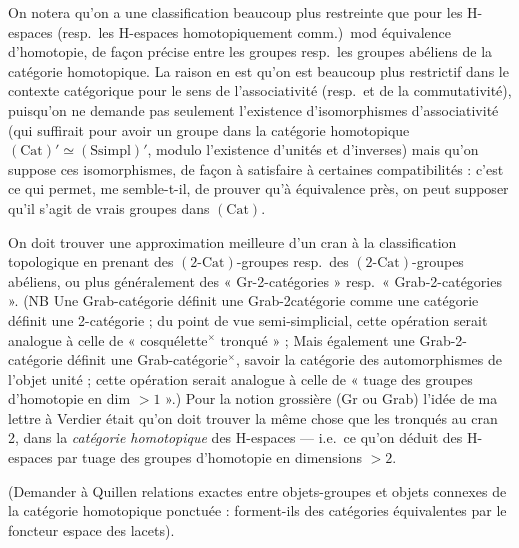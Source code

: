 \documentclass[11pt,a4paper]{article}
\begin{document}
On notera qu'on a une classification beaucoup plus restreinte que pour les
H-espaces (resp.\ les H-espaces homotopiquement comm.)\ mod équivalence
d'homotopie, de façon précise entre les groupes resp.\ les groupes abéliens de
la catégorie homotopique. La raison en est qu'on est beaucoup plus restrictif
dans le contexte catégorique pour le sens de l'associativité (resp.\ et de la
commutativité), puisqu'on ne demande pas seulement l'existence d'isomorphismes
d'associativité (qui suffirait pour avoir un groupe dans la catégorie
homotopique $(\mathrm{Cat})' \simeq (\mathrm{Ssimpl})'$, modulo l'existence
d'unités et d'inverses) mais qu'on suppose  ces
isomorphismes, de façon à satisfaire à certaines compatibilités : c'est ce qui
permet, me semble-t-il, de prouver qu'à équivalence près, on peut supposer
qu'il s'agit de vrais groupes dans $(\mathrm{Cat})$.


On doit trouver une approximation meilleure d'un cran à la classification
topologique en prenant des $(2\text{-Cat})$-groupes resp.\ des
$(2\text{-Cat})$-groupes abéliens, ou plus généralement des
« Gr-2-catégories » resp.\ « Grab-2-catégories ». (NB Une Grab-catégorie
définit une Grab-2catégorie comme une catégorie définit une 2-catégorie ; du
point de vue semi-simplicial, cette opération serait analogue à celle de
« cosquélette${}^{\times}$ tronqué » ; Mais également une Grab-2-catégorie
définit une Grab-catégorie${}^{\times}$, savoir la catégorie des
automorphismes de l'objet unité ; cette opération serait analogue à celle de
« tuage des groupes d'homotopie en dim $> 1$ ».) Pour la notion grossière (Gr
ou Grab) l'idée de ma lettre à Verdier était qu'on doit trouver la même chose
que les tronqués au cran 2, dans la \emph{catégorie homotopique} des
H-espaces --- i.e.\ ce qu'on déduit des H-espaces par tuage des groupes
d'homotopie en dimensions $> 2$.

(Demander à Quillen relations exactes entre objets-groupes et objets connexes
de la catégorie homotopique ponctuée : forment-ils des catégories équivalentes
par le foncteur espace des lacets).
\end{document}
